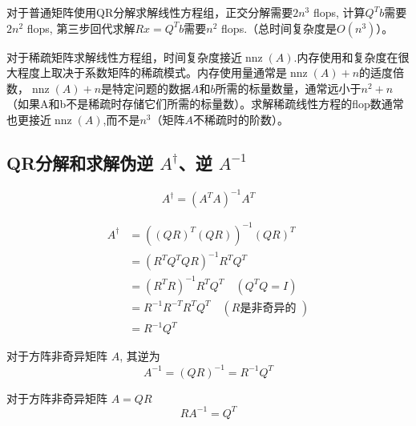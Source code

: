 对于普通矩阵使用QR分解求解线性方程组，正交分解需要$2 n^3$ flops, 计算$Q^T b$需要$2n^2$ flops, 第三步回代求解$Rx = Q^Tb$需要$n^2$ flops.（总时间复杂度是$O(n^3)$）。 

对于稀疏矩阵求解线性方程组，时间复杂度接近$\operatorname{nnz}(A)$.内存使用和复杂度在很大程度上取决于系数矩阵的稀疏模式。内存使用量通常是$\operatorname{nnz}(A)+n$的适度倍数，$\operatorname{nnz}(A)+n$是特定问题的数据$A$和$b$所需的标量数量，通常远小于$n^2+n$（如果A和b不是稀疏时存储它们所需的标量数）。求解稀疏线性方程的flop数通常也更接近$\operatorname{nnz}(A)$,而不是$n^3$（矩阵$A$不稀疏时的阶数）。


\subsection{QR分解和求解伪逆 $A^{\dagger}$、逆 $A^{-1}$}

\begin{definition}
    \begin{equation}A^{\dagger}=\left(A^{T} A\right)^{-1} A^{T}\end{equation}
\end{definition}

\begin{theorem}
    \begin{equation}
\begin{aligned}
A^{\dagger}&=\left((Q R)^{T}(Q R)\right)^{-1}(Q R)^{T} \\
&=\left(R^{T} Q^{T} Q R\right)^{-1} R^{T} Q^{T} \\
&=\left(R^{T} R\right)^{-1} R^{T} Q^{T} \quad\left(Q^{T} Q=I\right) \\
&=R^{-1} R^{-T} R^{T} Q^{T} \quad(R{\text {是非奇异的 }}) \\
 &={R^{-1} Q^{T}}
\end{aligned}
\end{equation}
\end{theorem}

\begin{corollary}
    对于方阵非奇异矩阵 ${A}$, 其逆为
\begin{equation}
A^{-1}=(Q R)^{-1}=R^{-1} Q^{T}
\end{equation}
\end{corollary}

\begin{corollary}
    对于方阵非奇异矩阵 ${A} = QR$
    \begin{equation}RA^{-1} = Q^T\end{equation}
\end{corollary}

